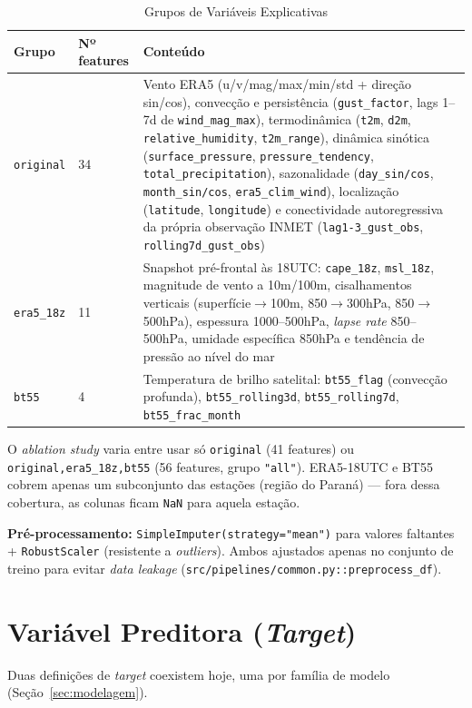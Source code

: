 \documentclass[11pt,a4paper]{article}
\begin{document}
\begin{table}[h]
\centering
\caption{Grupos de Variáveis Explicativas}
\vspace{2mm}
\begin{tabularx}{\textwidth}{llX}
\toprule
\textbf{Grupo} & \textbf{Nº features} & \textbf{Conteúdo} \\
\midrule
\texttt{original} & 34 & Vento ERA5 (u/v/mag/max/min/std + direção sin/cos), convecção e persistência (\texttt{gust\_factor}, lags 1--7d de \texttt{wind\_mag\_max}), termodinâmica (\texttt{t2m}, \texttt{d2m}, \texttt{relative\_humidity}, \texttt{t2m\_range}), dinâmica sinótica (\texttt{surface\_pressure}, \texttt{pressure\_tendency}, \texttt{total\_precipitation}), sazonalidade (\texttt{day\_sin/cos}, \texttt{month\_sin/cos}, \texttt{era5\_clim\_wind}), localização (\texttt{latitude}, \texttt{longitude}) e conectividade autoregressiva da própria observação INMET (\texttt{lag1-3\_gust\_obs}, \texttt{rolling7d\_gust\_obs}) \\
\texttt{era5\_18z} & 11 & Snapshot pré-frontal às 18UTC: \texttt{cape\_18z}, \texttt{msl\_18z}, magnitude de vento a 10m/100m, cisalhamentos verticais (superfície$\rightarrow$100m, 850$\rightarrow$300hPa, 850$\rightarrow$500hPa), espessura 1000--500hPa, \textit{lapse rate} 850--500hPa, umidade específica 850hPa e tendência de pressão ao nível do mar \\
\texttt{bt55} & 4 & Temperatura de brilho satelital: \texttt{bt55\_flag} (convecção profunda), \texttt{bt55\_rolling3d}, \texttt{bt55\_rolling7d}, \texttt{bt55\_frac\_month} \\
\bottomrule
\end{tabularx}
\end{table}

\noindent O \textit{ablation study} varia entre usar só \texttt{original} (41 features) ou \texttt{original,era5\_18z,bt55} (56 features, grupo \texttt{"all"}). ERA5-18UTC e BT55 cobrem apenas um subconjunto das estações (região do Paraná) --- fora dessa cobertura, as colunas ficam \texttt{NaN} para aquela estação.

\noindent \textbf{Pré-processamento:} \texttt{SimpleImputer(strategy="mean")} para valores faltantes + \texttt{RobustScaler} (resistente a \textit{outliers}). Ambos ajustados apenas no conjunto de treino para evitar \textit{data leakage} (\texttt{src/pipelines/common.py::preprocess\_df}).

\section{Variável Preditora (\textit{Target})}
Duas definições de \textit{target} coexistem hoje, uma por família de modelo (Seção~\ref{sec:modelagem}).
\end{document}
